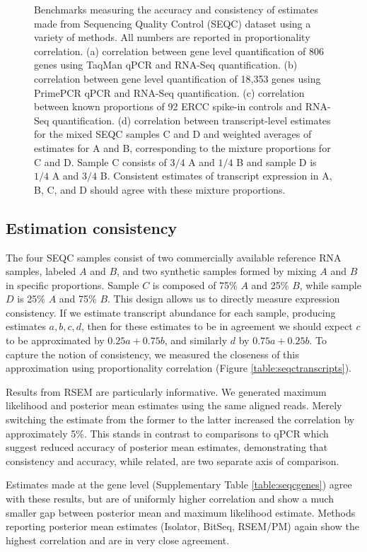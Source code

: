 \documentclass[twocolumn]{article}
\begin{document}
\begin{figure*}
\caption{
Benchmarks measuring the accuracy and consistency of estimates made from
Sequencing Quality Control (SEQC) dataset using a variety of methods.
All numbers are reported in proportionality correlation.
(a) correlation between gene level quantification
of 806 genes using TaqMan qPCR and RNA-Seq quantification.
(b) correlation between gene level quantification
of 18,353 genes using PrimePCR qPCR and RNA-Seq quantification.
(c) correlation between known proportions of 92
ERCC spike-in controls and RNA-Seq quantification.
(d) correlation between transcript-level estimates
for the mixed SEQC samples C and D and weighted averages of estimates for A
and B, corresponding to the mixture proportions for C and D. Sample C consists of
$3/4$ A and $1/4$ B and sample D is $1/4$ A and $3/4$ B. Consistent estimates of
transcript expression in A, B, C, and D should agree with these mixture
proportions.}
\end{figure*}

\subsection{Estimation consistency}\label{estimation-consistency}

The four SEQC samples consist of two commercially available reference RNA
samples, labeled $A$ and $B$, and two synthetic samples formed by mixing $A$ and
$B$ in specific proportions. Sample $C$ is composed of 75\% $A$ and 25\% $B$,
while sample $D$ is 25\% $A$ and 75\% $B$. This design allows us to directly
measure expression consistency. If we estimate transcript abundance for each
sample, producing estimates $a, b, c, d$, then for these estimates to be in
agreement we should expect $c$ to be approximated by $0.25a + 0.75b$, and
similarly $d$ by $0.75a + 0.25b$. To capture the notion of consistency, we
measured the closeness of this approximation using proportionality correlation
(Figure \ref{table:seqctranscripts}).

Results from RSEM are particularly informative. We generated maximum likelihood
and posterior mean estimates using the same aligned reads. Merely switching the
estimate from the former to the latter increased the correlation by
approximately 5\%. This stands in contrast to comparisons to qPCR which suggest
reduced accuracy of posterior mean estimates, demonstrating that consistency and
accuracy, while related, are two separate axis of comparison.

Estimates made at the gene level (Supplementary Table \ref{table:seqcgenes})
agree with these results, but are of uniformly higher correlation and show a
much smaller gap between posterior mean and maximum likelihood estimate.
Methods reporting posterior mean estimates (Isolator, BitSeq, RSEM/PM) again
show the highest correlation and are in very close agreement.
\end{document}
